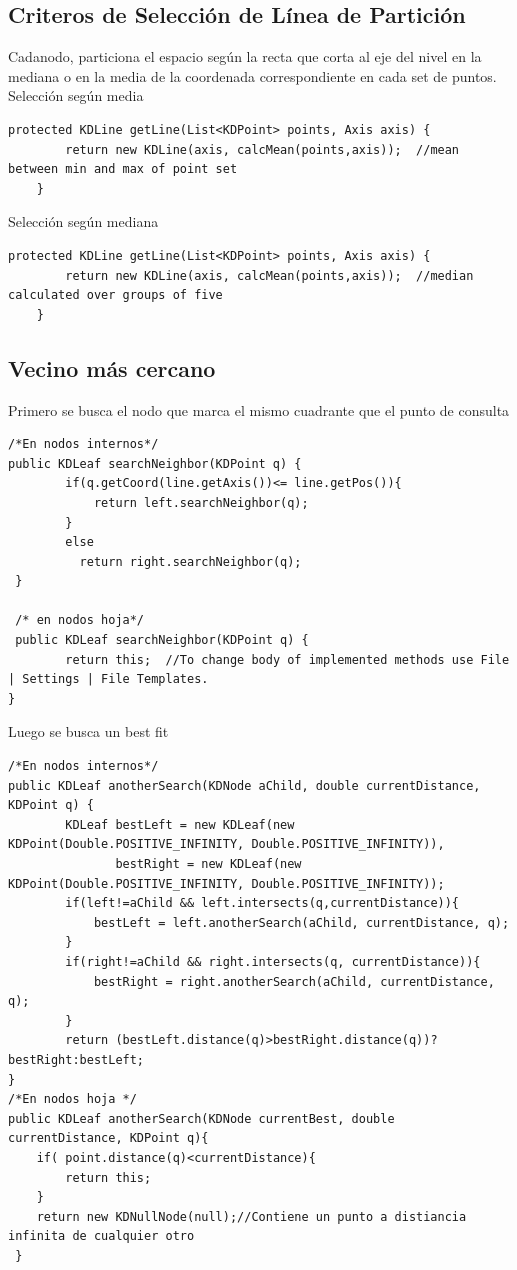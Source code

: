 \documentclass[12pt,letterpaper, margin = 3cm]{article}
\begin{document}
\subsection{Criteros de Selección de Línea de Partición}
Cadanodo, particiona el espacio según la recta que corta al eje del nivel en la mediana o en la media de la coordenada correspondiente en cada set de puntos. \\
Selección según media
\begin{lstlisting}
protected KDLine getLine(List<KDPoint> points, Axis axis) {
        return new KDLine(axis, calcMean(points,axis));  //mean between min and max of point set
    }
\end{lstlisting}
Selección según mediana
\begin{lstlisting}
protected KDLine getLine(List<KDPoint> points, Axis axis) {
        return new KDLine(axis, calcMean(points,axis));  //median calculated over groups of five
    }
\end{lstlisting}
\subsection{Vecino más cercano}
Primero se busca el nodo que marca el mismo cuadrante que el punto de consulta
\begin{lstlisting}
/*En nodos internos*/
public KDLeaf searchNeighbor(KDPoint q) {
        if(q.getCoord(line.getAxis())<= line.getPos()){
            return left.searchNeighbor(q);
        }
        else
          return right.searchNeighbor(q);
 }
 
 /* en nodos hoja*/
 public KDLeaf searchNeighbor(KDPoint q) {
        return this;  //To change body of implemented methods use File | Settings | File Templates.
}
\end{lstlisting}
Luego se busca un best fit
\begin{lstlisting}
/*En nodos internos*/
public KDLeaf anotherSearch(KDNode aChild, double currentDistance, KDPoint q) {
        KDLeaf bestLeft = new KDLeaf(new KDPoint(Double.POSITIVE_INFINITY, Double.POSITIVE_INFINITY)),
               bestRight = new KDLeaf(new KDPoint(Double.POSITIVE_INFINITY, Double.POSITIVE_INFINITY));
        if(left!=aChild && left.intersects(q,currentDistance)){
            bestLeft = left.anotherSearch(aChild, currentDistance, q);
        }
        if(right!=aChild && right.intersects(q, currentDistance)){
            bestRight = right.anotherSearch(aChild, currentDistance, q);
        }
        return (bestLeft.distance(q)>bestRight.distance(q))? bestRight:bestLeft;
}
/*En nodos hoja */
public KDLeaf anotherSearch(KDNode currentBest, double currentDistance, KDPoint q){
    if( point.distance(q)<currentDistance){
        return this;
    }
    return new KDNullNode(null);//Contiene un punto a distiancia infinita de cualquier otro
 }
\end{lstlisting}



\end{document}
